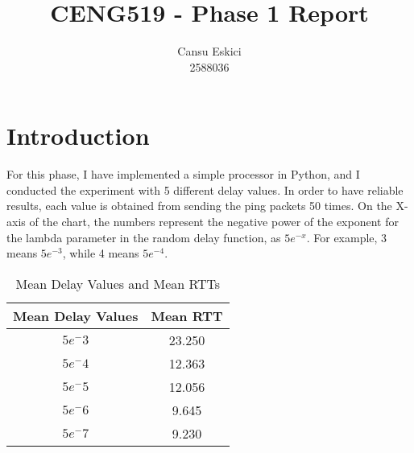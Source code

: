 \documentclass[10pt,a4paper, margin=1in]{article}
\title{CENG519 - Phase 1 Report}
\author{
  Cansu Eskici\\
  2588036}
\begin{document}
\maketitle
\section*{Introduction}
For this phase, I have implemented a simple processor in Python, and I conducted the experiment with 5 different delay values. 
In order to have reliable results, each value is obtained from sending the ping packets 50 times. 
On the X-axis of the chart, the numbers represent the negative power of the exponent for the lambda parameter in the random delay function, as $5e^{-x}$. For example, 3 means $5e^{-3}$, while 4 means $5e^{-4}$.


\vspace{1cm}

\begin{minipage}{0.5\textwidth}
\end{minipage}
\begin{minipage}{0.5\textwidth}
    \begin{table}[H]
    \centering
    \begin{tabular}{|c|c|}
        \hline
        Mean Delay Values & Mean RTT \\
        \hline
        ${5e^-3}$ & 23.250 \\
        ${5e^-4}$ & 12.363 \\
        ${5e^-5}$ & 12.056 \\
        ${5e^-6}$ & 9.645 \\
        ${5e^-7}$ & 9.230 \\
        \hline
    \end{tabular}
    \caption*{Mean Delay Values and Mean RTTs }
    \label{tab:xy_table}
\end{table}
\end{minipage}
\vspace{0.4cm}
\end{document}
